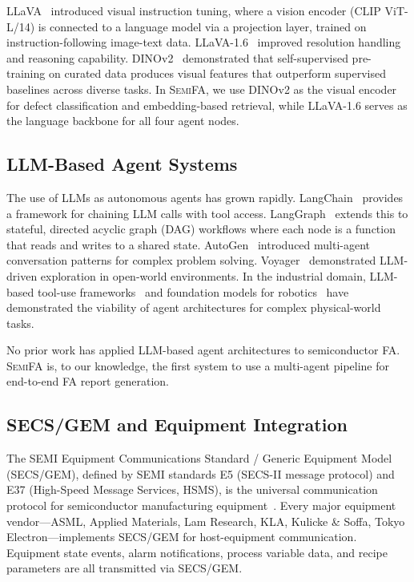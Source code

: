 \documentclass[conference]{IEEEtran}
\newcommand{\semifa}{\textsc{SemiFA}}
\begin{document}
LLaVA~\cite{liu2024visual} introduced visual instruction tuning, where a vision encoder (CLIP ViT-L/14) is connected to a language model via a projection layer, trained on instruction-following image-text data.
LLaVA-1.6~\cite{liu2024llava16} improved resolution handling and reasoning capability.
DINOv2~\cite{oquab2024dinov2} demonstrated that self-supervised pre-training on curated data produces visual features that outperform supervised baselines across diverse tasks.
In \semifa{}, we use DINOv2 as the visual encoder for defect classification and embedding-based retrieval, while LLaVA-1.6 serves as the language backbone for all four agent nodes.

\subsection{LLM-Based Agent Systems}

The use of LLMs as autonomous agents has grown rapidly.
LangChain~\cite{langchain2024} provides a framework for chaining LLM calls with tool access.
LangGraph~\cite{langgraph2024} extends this to stateful, directed acyclic graph (DAG) workflows where each node is a function that reads and writes to a shared state.
AutoGen~\cite{wu2023autogen} introduced multi-agent conversation patterns for complex problem solving.
Voyager~\cite{wang2023voyager} demonstrated LLM-driven exploration in open-world environments.
In the industrial domain, LLM-based tool-use frameworks~\cite{qin2023toolllm} and foundation models for robotics~\cite{firoozi2023llm_robotics} have demonstrated the viability of agent architectures for complex physical-world tasks.

No prior work has applied LLM-based agent architectures to semiconductor FA.
\semifa{} is, to our knowledge, the first system to use a multi-agent pipeline for end-to-end FA report generation.

\subsection{SECS/GEM and Equipment Integration}

The SEMI Equipment Communications Standard / Generic Equipment Model (SECS/GEM), defined by SEMI standards E5 (SECS-II message protocol) and E37 (High-Speed Message Services, HSMS), is the universal communication protocol for semiconductor manufacturing equipment~\cite{semi_e5,semi_e37}.
Every major equipment vendor---ASML, Applied Materials, Lam Research, KLA, Kulicke \& Soffa, Tokyo Electron---implements SECS/GEM for host-equipment communication.
Equipment state events, alarm notifications, process variable data, and recipe parameters are all transmitted via SECS/GEM.
\end{document}
